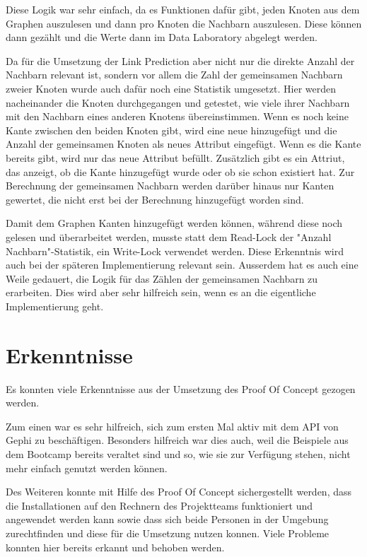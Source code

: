 Diese Logik war sehr einfach, da es Funktionen dafür gibt, jeden Knoten aus dem Graphen auszulesen und dann pro Knoten
die Nachbarn auszulesen. Diese können dann gezählt und die Werte dann im Data Laboratory abgelegt werden.

Da für die Umsetzung der Link Prediction aber nicht nur die direkte Anzahl der Nachbarn relevant ist, sondern vor allem
die Zahl der gemeinsamen Nachbarn zweier Knoten wurde auch dafür noch eine Statistik umgesetzt. Hier werden nacheinander
die Knoten durchgegangen und getestet, wie viele ihrer Nachbarn mit den Nachbarn eines anderen Knotens übereinstimmen.
Wenn es noch keine Kante zwischen den beiden Knoten gibt, wird eine neue hinzugefügt und die Anzahl der gemeinsamen
Knoten als neues Attribut eingefügt. Wenn es die Kante bereits gibt, wird nur das neue Attribut befüllt. Zusätzlich
gibt es ein Attriut, das anzeigt, ob die Kante hinzugefügt wurde oder ob sie schon existiert hat. Zur Berechnung der
gemeinsamen Nachbarn werden darüber hinaus nur Kanten gewertet, die nicht erst bei der Berechnung hinzugefügt worden
sind.

Damit dem Graphen Kanten hinzugefügt werden können, während diese noch gelesen und überarbeitet werden, musste statt
dem Read-Lock der "Anzahl Nachbarn"-Statistik, ein Write-Lock verwendet werden. Diese Erkenntnis wird auch bei der
späteren Implementierung relevant sein. Ausserdem hat es auch eine Weile gedauert, die Logik für das Zählen der
gemeinsamen Nachbarn zu erarbeiten. Dies wird aber sehr hilfreich sein, wenn es an die eigentliche Implementierung geht.

\section{Erkenntnisse}

Es konnten viele Erkenntnisse aus der Umsetzung des Proof Of Concept gezogen werden.

Zum einen war es sehr hilfreich, sich zum ersten Mal aktiv mit dem API von Gephi zu beschäftigen. Besonders hilfreich
war dies auch, weil die Beispiele aus dem Bootcamp bereits veraltet sind und so, wie sie zur Verfügung stehen, nicht
mehr einfach genutzt werden können.

Des Weiteren konnte mit Hilfe des Proof Of Concept sichergestellt werden, dass die Installationen auf den Rechnern des
Projektteams funktioniert und angewendet werden kann sowie dass sich beide Personen in der Umgebung zurechtfinden und
diese für die Umsetzung nutzen konnen. Viele Probleme konnten hier bereits erkannt und behoben werden.


